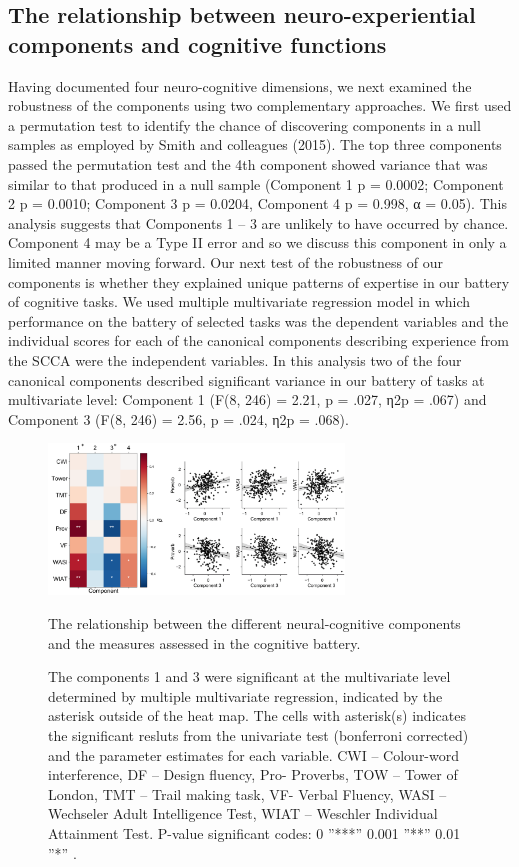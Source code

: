 \subsection{The relationship between neuro-experiential components and cognitive functions}
\label{study2:results:manova}
Having documented four neuro-cognitive dimensions, we next examined the robustness of the components using two complementary approaches. We first used a permutation test to identify the chance of discovering components in a null samples as employed by Smith and colleagues (2015). The top three components passed the permutation test and the 4th component showed variance that was similar to that produced in a null sample (Component 1 p = 0.0002; Component 2 p = 0.0010; Component 3 p = 0.0204, Component 4 p = 0.998, α = 0.05). This analysis suggests that Components 1 – 3 are unlikely to have occurred by chance. Component 4 may be a Type II error and so we discuss this component in only a limited manner moving forward.
Our next test of the robustness of our components is whether they explained unique patterns of expertise in our battery of cognitive tasks. We used multiple multivariate regression model in which performance on the battery of selected tasks was the dependent variables and the individual scores for each of the canonical components describing experience from the SCCA were the independent variables. In this analysis two of the four canonical components described significant variance in our battery of tasks at multivariate level: Component 1 (F(8, 246) = 2.21, p = .027, η2p = .067) and Component 3 (F(8, 246) = 2.56, p = .024, η2p = .068). 
\begin{figure}[H]
    \centering
    \includegraphics[width=0.7\textwidth]{chapters/img/study2fig3.png}
    \caption{The relationship between the different neural-cognitive components and the measures assessed in the cognitive battery.} 
    \caption*{
    \footnotesize{
    The components 1 and 3 were significant at the multivariate level determined by multiple multivariate regression, indicated by the asterisk outside of the heat map. The cells with asterisk(s) indicates the significant resluts from the univariate test (bonferroni corrected) and the parameter estimates for each variable. CWI – Colour-word interference, DF – Design fluency, Pro- Proverbs, TOW – Tower of London, TMT – Trail making task, VF- Verbal Fluency, WASI – Wechseler Adult Intelligence Test, WIAT – Weschler Individual Attainment Test. P-value significant codes:  0 ”***” 0.001 ”**” 0.01 ”*” .}
    }
    \label{fig:study2:fig3}
\end{figure}
